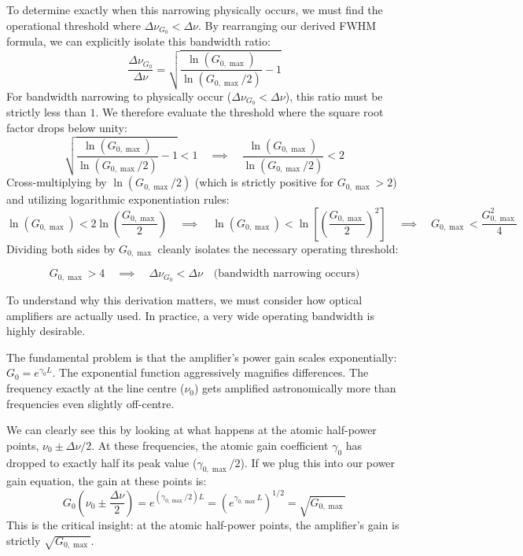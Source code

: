 To determine exactly when this narrowing physically occurs, we must find the operational threshold where $\Delta\nu_{G_0} < \Delta\nu$. By rearranging our derived FWHM formula, we can explicitly isolate this bandwidth ratio:
\begin{equation*}
    \frac{\Delta\nu_{G_0}}{\Delta\nu} = \sqrt{\frac{\ln(G_{0,\max})}{\ln(G_{0,\max}/2)} - 1}
\end{equation*}
For bandwidth narrowing to physically occur ($\Delta\nu_{G_0} < \Delta\nu$), this ratio must be strictly less than $1$. We therefore evaluate the threshold where the square root factor drops below unity:
\begin{equation*}
    \sqrt{\frac{\ln(G_{0,\max})}{\ln(G_{0,\max}/2)} - 1} < 1
    \quad\implies\quad
    \frac{\ln(G_{0,\max})}{\ln(G_{0,\max}/2)} < 2
\end{equation*}
Cross-multiplying by $\ln(G_{0,\max}/2)$ (which is strictly positive for $G_{0,\max} > 2$) and utilizing logarithmic exponentiation rules:
\begin{equation*}
    \ln(G_{0,\max}) < 2\ln\!\left(\frac{G_{0,\max}}{2}\right)
    \quad\implies\quad
    \ln(G_{0,\max}) < \ln\!\left[\left(\frac{G_{0,\max}}{2}\right)^2\right]
    \quad\implies\quad
    G_{0,\max} < \frac{G_{0,\max}^2}{4}
\end{equation*}
Dividing both sides by $G_{0,\max}$ cleanly isolates the necessary operating threshold:
\begin{keyresult}
    \begin{equation}
        G_{0,\max} > 4 \quad\implies\quad \Delta\nu_{G_0} < \Delta\nu \quad
        \text{(bandwidth narrowing occurs)}
    \end{equation}
\end{keyresult}

To understand why this derivation matters, we must consider how optical amplifiers are actually used. In practice, a very wide operating bandwidth is highly desirable.

The fundamental problem is that the amplifier's power gain scales exponentially: $G_0 = e^{\gamma_0 L}$.
The exponential function aggressively magnifies differences. The frequency exactly at the line centre ($\nu_0$) gets amplified astronomically more than frequencies even slightly off-centre.

We can clearly see this by looking at what happens at the atomic half-power points, $\nu_0 \pm \Delta\nu/2$. At these frequencies, the atomic gain coefficient $\gamma_0$ has dropped to exactly half its peak value ($\gamma_{0,\max}/2$). If we plug this into our power gain equation, the gain at these points is:
\begin{equation*}
    G_0\!\left(\nu_0 \pm \frac{\Delta\nu}{2}\right)
    = e^{(\gamma_{0,\max}/2)L}
    = \left( e^{\gamma_{0,\max}L} \right)^{1/2}
    = \sqrt{G_{0,\max}}
\end{equation*}
This is the critical insight: at the atomic half-power points, the amplifier's gain is strictly $\sqrt{G_{0,\max}}$.

